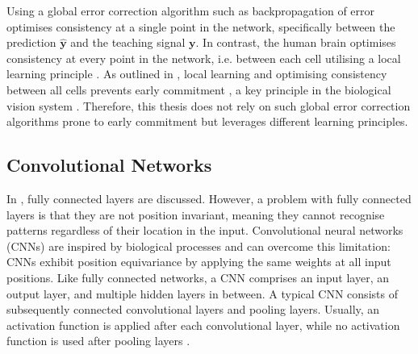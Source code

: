 Using a global error correction algorithm such as backpropagation of error optimises consistency at a single point in the network, specifically between the prediction $\boldsymbol{\hat{y}}$ and the teaching signal $\boldsymbol{y}$.
In contrast, the human brain optimises consistency at every point in the network, i.e. between each cell utilising a local learning principle . 
As outlined in , local learning and optimising consistency between all cells prevents early commitment , a key principle in the biological vision system .
Therefore, this thesis does not rely on such global error correction algorithms prone to early commitment but leverages different learning principles.


\subsection{Convolutional Networks}
In , fully connected layers are discussed.
However, a problem with fully connected layers is that they are not position invariant, meaning they cannot recognise patterns regardless of their location in the input.
Convolutional neural networks (CNNs)  are inspired by biological processes  and can overcome this limitation: CNNs exhibit position equivariance by applying the same weights at all input positions.
Like fully connected networks, a CNN comprises an input layer, an output layer, and multiple hidden layers in between.
A typical CNN consists of subsequently connected convolutional layers and pooling layers.
Usually, an activation function is applied after each convolutional layer, while no activation function is used after pooling layers .

